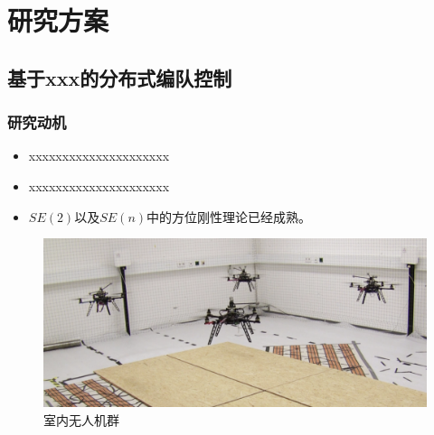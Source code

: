 \documentclass{beamer}
\theoremstyle{remark}
\begin{document}
\section{研究方案}
\subsection{基于xxx的分布式编队控制}
\begin{frame}
	\frametitle{研究动机}
	\begin{itemize}
		\item  xxxxxxxxxxxxxxxxxxxxx
		\item xxxxxxxxxxxxxxxxxxxxx
		\item $SE(2)$以及$SE(n)$中的方位刚性理论已经成熟。
	\end{itemize}
	\begin{figure}[htbp]
		\centering
			\centering
			\includegraphics[width=0.8\linewidth]{Fig/f5.png}
			\caption{室内无人机群}
	\end{figure}	
\end{frame}
\end{document}
